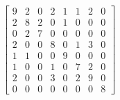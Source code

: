 \documentclass[xcolor=x11names,compress]{beamer}
\begin{document}
\begin{frame}
	\[
		\begin{bmatrix}
			9 & 2 & 0 & 2 & 1 & 1 & 2 & 0 \\
			2 & 8 & 2 & 0 & 1 & 0 & 0 & 0 \\
			0 & 2 & 7 & 0 & 0 & 0 & 0 & 0 \\
			2 & 0 & 0 & 8 & 0 & 1 & 3 & 0 \\
			1 & 1 & 0 & 0 & 9 & 0 & 0 & 0 \\
			1 & 0 & 0 & 1 & 0 & 7 & 2 & 0 \\
			2 & 0 & 0 & 3 & 0 & 2 & 9 & 0 \\
			0 & 0 & 0 & 0 & 0 & 0 & 0 & 8
		\end{bmatrix}
	\]
\end{frame}

\begin{frame}
	\begin{overprint}
		\spymatrixpresentation{\matrixdefaulta}
		\spymatrixpresentation{\matrixdefaultb}
		\spymatrixpresentation{\matrixdefaultc}
		\spymatrixpresentation{\matrixdefaultd}
		\spymatrixpresentation{\matrixdefaulte}
		\spymatrixpresentation{\matrixdefaultf}
		\spymatrixpresentation{\matrixdefaultg}
	\end{overprint}
\end{frame}
\end{document}
